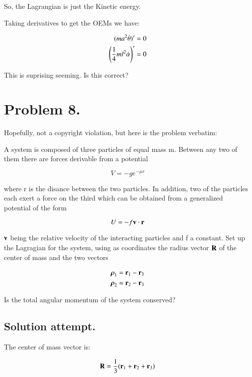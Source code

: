 \documentclass{article}      %
\newcommand{\Brho}[0]{\boldsymbol{\rho}}
\newcommand{\dotalpha}[0]{\dot{\alpha}}
\newcommand{\dottheta}[0]{\dot{\theta}}
\begin{document}
So, the Lagrangian is just the Kinetic energy.

Taking derivatives to get the OEMs we have:

\begin{align*}
(m a^2 \dottheta)' &= 0 \\
\left(\inv{4} m l^2 \dotalpha \right)' &= 0
\end{align*}

This is suprising seeming.  Is this correct?

\section{ Problem 8. }

Hopefully, not a copyright violation, but here is the problem verbatim:

A system is composed of three particles of equal mass m.  Between any two of them there are forces derivable from a potential

\begin{equation*}
V = -g e^{-\mu r}
\end{equation*}

where r is the disance between the two particles.  In addition, two of the particles each exert a force on the third which can be obtained from a generalized potential of the form

\begin{equation*}
U = -f \mathbf{v} \cdot \mathbf{r}
\end{equation*}

$\mathbf{v}$ being the relative velocity of the interacting particles and f a constant.  Set up the Lagragian for the system, using as coordinates the radius vector $\mathbf{R}$ of the center of mass and the two vectors

\begin{align*}
\Brho_1 &= \Br_1 - \Br_3 \\
\Brho_2 &= \Br_2 - \Br_3
\end{align*}

Is the total angular momentum of the system conserved?

\subsection{ Solution attempt. }

The center of mass vector is:

\begin{equation*}
\mathbf{R} = \frac{1}{3}(\mathbf{r}_1 + \mathbf{r}_2 + \mathbf{r}_3)
\end{equation*}
\end{document}
